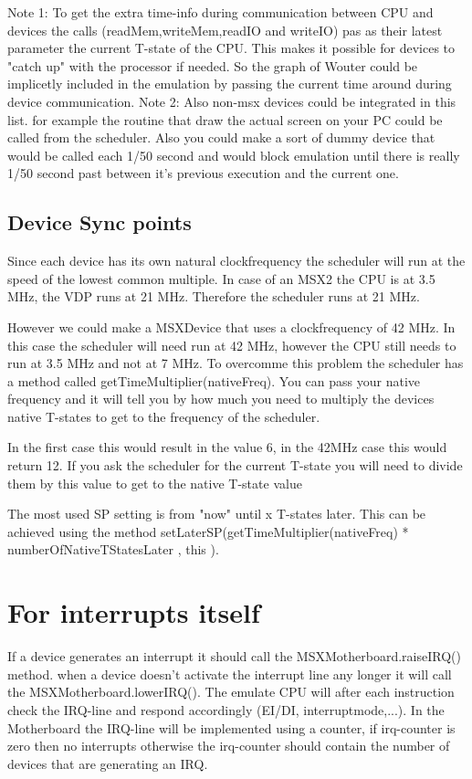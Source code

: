 \documentclass[11pt, a4paper]{report}
\begin{document}
Note 1: To get the extra time-info during communication between CPU and
devices the calls (readMem,writeMem,readIO and writeIO) pas as their
latest parameter the current T-state of the CPU. This makes it possible
for devices to "catch up" with the processor if needed. So the graph of
Wouter could be implicetly included in the emulation by passing
the current time around during device communication.
Note 2: Also non-msx devices could be integrated in this list. for example
the routine that draw the actual screen on your PC could be called from
the scheduler. Also you could make a sort of dummy device that would be
called each 1/50 second and would block emulation until there is really
1/50 second past between it's previous execution and the current one.

\subsection{Device Sync points}

Since each device has its own natural clockfrequency the scheduler will
run at the speed of the lowest common multiple. In case of an MSX2 the CPU
is at 3.5 MHz, the VDP runs at 21 MHz. Therefore the scheduler runs at 21
MHz.

However we could make a MSXDevice that uses a clockfrequency of 42 MHz. In
this case the scheduler will need run at 42 MHz, however the CPU still
needs to run at 3.5 MHz and not at 7 MHz. To overcomme this problem the
scheduler has a method called getTimeMultiplier(nativeFreq). You can pass
your native frequency and it will tell you by how much you need to
multiply the devices native T-states to get to the frequency of the
scheduler. 

In the first case this would result in the value 6, in the 42MHz case this
would return 12. If you ask the scheduler for the current T-state you will
need to divide them by this value to get to the native T-state value 

The most used SP setting is from "now" until x T-states later. This can be
achieved using the method setLaterSP(getTimeMultiplier(nativeFreq) *
numberOfNativeTStatesLater , this ).


\section{For interrupts itself}

If a device generates an interrupt it should call the
MSXMotherboard.raiseIRQ() method. when a device doesn't activate
the interrupt line any longer it will call the
MSXMotherboard.lowerIRQ(). The emulate CPU will after each
instruction check the IRQ-line and respond accordingly (EI/DI,
interruptmode,...).  In the Motherboard the IRQ-line will be
implemented using a counter, if irq-counter is zero then no
interrupts otherwise the irq-counter should contain the number of
devices that are generating an IRQ.
\end{document}
